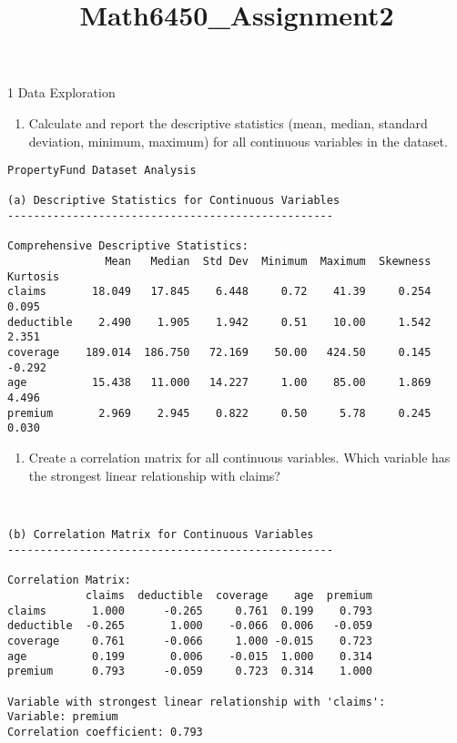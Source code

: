 \documentclass[8pt, twocolumn]{extarticle}
\title{Math6450\_Assignment2}
\providecommand{\tightlist}{%
      \setlength{\itemsep}{0pt}\setlength{\parskip}{0pt}}
\begin{document}
    
    \maketitle
    
    

    
    1 Data Exploration

    \begin{enumerate}
\def\labelenumi{(\alph{enumi})}
\tightlist
\item
  Calculate and report the descriptive statistics (mean, median,
  standard deviation, minimum, maximum) for all continuous variables in
  the dataset.
\end{enumerate}

    \begin{Verbatim}[commandchars=\\\{\}]
PropertyFund Dataset Analysis

(a) Descriptive Statistics for Continuous Variables
--------------------------------------------------

Comprehensive Descriptive Statistics:
               Mean   Median  Std Dev  Minimum  Maximum  Skewness  Kurtosis
claims       18.049   17.845    6.448     0.72    41.39     0.254     0.095
deductible    2.490    1.905    1.942     0.51    10.00     1.542     2.351
coverage    189.014  186.750   72.169    50.00   424.50     0.145    -0.292
age          15.438   11.000   14.227     1.00    85.00     1.869     4.496
premium       2.969    2.945    0.822     0.50     5.78     0.245     0.030
    \end{Verbatim}

    \begin{enumerate}
\def\labelenumi{(\alph{enumi})}
\setcounter{enumi}{1}
\tightlist
\item
  Create a correlation matrix for all continuous variables. Which
  variable has the strongest linear relationship with claims?
\end{enumerate}

    \begin{Verbatim}[commandchars=\\\{\}]


(b) Correlation Matrix for Continuous Variables
--------------------------------------------------

Correlation Matrix:
            claims  deductible  coverage    age  premium
claims       1.000      -0.265     0.761  0.199    0.793
deductible  -0.265       1.000    -0.066  0.006   -0.059
coverage     0.761      -0.066     1.000 -0.015    0.723
age          0.199       0.006    -0.015  1.000    0.314
premium      0.793      -0.059     0.723  0.314    1.000

Variable with strongest linear relationship with 'claims':
Variable: premium
Correlation coefficient: 0.793
    \end{Verbatim}
\end{document}
